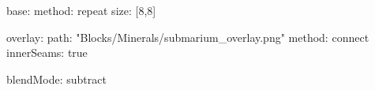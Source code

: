 base:
  method: repeat
  size: [8,8]

overlay:
  path: "Blocks/Minerals/submarium_overlay.png"
  method: connect
  innerSeams: true

blendMode: subtract
